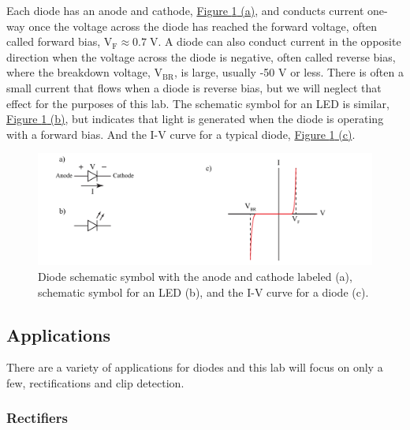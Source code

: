 Each diode has an anode and cathode, \hyperref[fig:idealDiode]{Figure \ref*{fig:idealDiode} (a)}, and conducts current one-way once the voltage across the diode has reached the forward voltage, often called forward bias, $\mathrm{V_F} \approx 0.7 \; \mathrm{V}$. A diode can also conduct current in the opposite direction when the voltage across the diode is negative, often called reverse bias, where the breakdown voltage, $\mathrm{V_{BR}}$, is large, usually -50 V or less. There is often a small current that flows when a diode is reverse bias, but we will neglect that effect for the purposes of this lab. The schematic symbol for an LED is similar, \hyperref[fig:idealDiode]{Figure \ref*{fig:idealDiode} (b)}, but indicates that light is generated when the diode is operating with a forward bias. And the I-V curve for a typical diode, \hyperref[fig:idealDiode]{Figure \ref*{fig:idealDiode} (c)}.

\begin{figure} [h!]
	\centering
		\includegraphics[width=1\textwidth]{Lab6idealDiodes.pdf}
	\caption{Diode schematic symbol with the anode and cathode labeled (a), schematic symbol for an LED (b), and the I-V curve for a diode (c).} \label{fig:idealDiode}
\end{figure}



\subsection{Applications}

There are a variety of applications for diodes and this lab will focus on only a few, rectifications and clip detection.

\subsubsection{Rectifiers}

